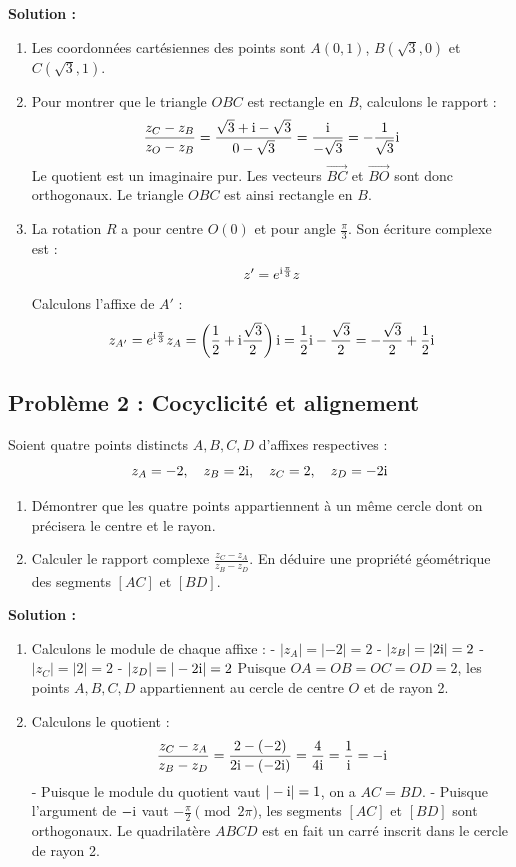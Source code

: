 \textbf{Solution :}
\begin{enumerate}
    \item Les coordonnées cartésiennes des points sont $A(0, 1)$, $B(\sqrt{3}, 0)$ et $C(\sqrt{3}, 1)$.
    \item Pour montrer que le triangle $OBC$ est rectangle en $B$, calculons le rapport :
    \[
    \frac{z_C - z_B}{z_O - z_B} = \frac{\sqrt{3} + \mathrm{i} - \sqrt{3}}{0 - \sqrt{3}} = \frac{\mathrm{i}}{-\sqrt{3}} = -\frac{1}{\sqrt{3}}\mathrm{i}
    \]
    Le quotient est un imaginaire pur. Les vecteurs $\vec{BC}$ et $\vec{BO}$ sont donc orthogonaux. Le triangle $OBC$ est ainsi rectangle en $B$.
    \item La rotation $R$ a pour centre $O(0)$ et pour angle $\frac{\pi}{3}$. Son écriture complexe est :
    \[
    z' = e^{\mathrm{i}\frac{\pi}{3}} z
    \]
    Calculons l'affixe de $A'$ :
    \[
    z_{A'} = e^{\mathrm{i}\frac{\pi}{3}} z_A = \left(\frac{1}{2} + \mathrm{i}\frac{\sqrt{3}}{2}\right)\mathrm{i} = \frac{1}{2}\mathrm{i} - \frac{\sqrt{3}}{2} = -\frac{\sqrt{3}}{2} + \frac{1}{2}\mathrm{i}
    \]
\end{enumerate}

\subsection*{Problème 2 : Cocyclicité et alignement}
Soient quatre points distincts $A, B, C, D$ d'affixes respectives :
\[
z_A = -2, \quad z_B = 2\mathrm{i}, \quad z_C = 2, \quad z_D = -2\mathrm{i}
\]
\begin{enumerate}
    \item Démontrer que les quatre points appartiennent à un même cercle dont on précisera le centre et le rayon.
    \item Calculer le rapport complexe $\frac{z_C - z_A}{z_B - z_D}$. En déduire une propriété géométrique des segments $[AC]$ et $[BD]$.
\end{enumerate}

\textbf{Solution :}
\begin{enumerate}
    \item Calculons le module de chaque affixe :
    - $|z_A| = |-2| = 2$
    - $|z_B| = |2\mathrm{i}| = 2$
    - $|z_C| = |2| = 2$
    - $|z_D| = |-2\mathrm{i}| = 2$
    Puisque $OA = OB = OC = OD = 2$, les points $A, B, C, D$ appartiennent au cercle de centre $O$ et de rayon 2.
    \item Calculons le quotient :
    \[
    \frac{z_C - z_A}{z_B - z_D} = \frac{2 - (-2)}{2\mathrm{i} - (-2\mathrm{i})} = \frac{4}{4\mathrm{i}} = \frac{1}{\mathrm{i}} = -\mathrm{i}
    \]
    - Puisque le module du quotient vaut $|-\mathrm{i}| = 1$, on a $AC = BD$.
    - Puisque l'argument de $-\mathrm{i}$ vaut $-\frac{\pi}{2} \pmod{2\pi}$, les segments $[AC]$ et $[BD]$ sont orthogonaux.
    Le quadrilatère $ABCD$ est en fait un carré inscrit dans le cercle de rayon 2.
\end{enumerate}
